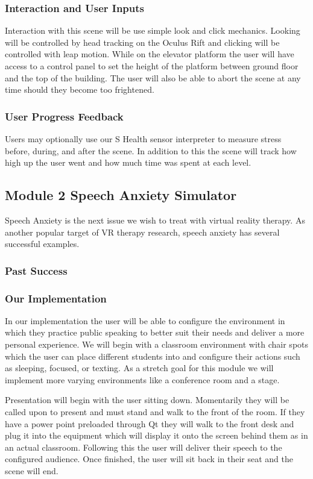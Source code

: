 \documentclass[a4paper,10pt]{article}
\begin{document}
\subsubsection{Interaction and User Inputs}
Interaction with this scene will be use simple look and click mechanics. Looking will be controlled by head tracking on the Oculus Rift and clicking will be controlled with leap motion. While on the elevator platform the user will have access to a control panel to set the height of the platform between ground floor and the top of the building. The user will also be able to abort the scene at any time should they become too frightened. 

\subsubsection{User Progress Feedback}
Users may optionally use our S Health sensor interpreter to measure stress before, during, and after the scene. In addition to this the scene will track how high up the user went and how much time was spent at each level.

\pagebreak
\subsection{Module 2 Speech Anxiety Simulator}
Speech Anxiety is the next issue we wish to treat with virtual reality therapy. As another popular target of VR therapy research, speech anxiety has several successful examples.

\subsubsection{Past Success}

\subsubsection{Our Implementation}
In our implementation the user will be able to configure the environment in which they practice public speaking to better suit their needs and deliver a more personal experience. We will begin with a classroom environment with chair spots which the user can place different students into and configure their actions such as sleeping, focused, or texting. As a stretch goal for this module we will implement more varying environments like a conference room and a stage.

Presentation will begin with the user sitting down. Momentarily they will be called upon to present and must stand and walk to the front of the room. If they have a power point preloaded through Qt they will walk to the front desk and plug it into the equipment which will display it onto the screen behind them as in an actual classroom. Following this the user will deliver their speech to the configured audience. Once finished, the user will sit back in their seat and the scene will end.
\end{document}
